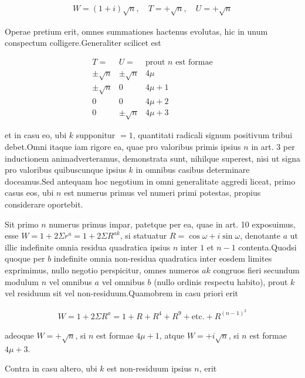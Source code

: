 \[
\begin{aligned}
W=(1+i)\surd n,\quad T=+\surd n,\quad U=+\surd n
\end{aligned}
\]


Operae pretium erit, omnes summationes hactenus evolutas, hic in unum conspectum colligere.\quad Generaliter scilicet est

\[
\begin{array}{c|c|c}
T=&U=&\text{prout }n\text{ est formae}\\\hline
\pm\surd n&\pm\surd n&4\mu\\
\pm\surd n&0&4\mu+1\\
0&0&4\mu+2\\
0&\pm\surd n&4\mu+3
\end{array}
\]

et in casu eo, ubi $k$ supponitur $=1$, quantitati radicali signum positivum tribui debet.\quad Omni itaque iam rigore ea, quae pro valoribus primis ipsius $n$ in art. 3 per inductionem animadverteramus, demonstrata sunt, nihilque superest, nisi ut signa pro valoribus quibuscunque ipsius $k$ in omnibus casibus determinare doceamus.\quad Sed antequam hoc negotium in omni generalitate aggredi liceat, primo casus eos, ubi $n$ est numerus primus vel numeri primi potestas, propius considerare oportebit.


Sit primo $n$ numerus primus impar, patetque per ea, quae in art. 10 exposuimus, esse $W=1+2\Sigma r^a=1+2\Sigma R^{ak}$, si statuatur $R=\cos\omega+i\sin\omega$, denotante $a$ ut illic indefinite omnia residua quadratica ipsius $n$ inter $1$ et $n-1$ contenta.\quad Quodsi quoque per $b$ indefinite omnia non-residua quadratica inter eosdem limites exprimimus, nullo negotio perspicitur, omnes numeros $ak$ congruos fieri secundum modulum $n$ vel omnibus $a$ vel omnibus $b$ (nullo ordinis respectu habito), prout $k$ vel residuum sit vel non-residuum.\quad Quamobrem in casu priori erit


\[
\begin{aligned}
W=1+2\Sigma R^a=1+R+R^4+R^9+\text{etc.}+R^{(n-1)^2}
\end{aligned}
\]

adeoque $W=+\surd n$, si $n$ est formae $4\mu+1$, atque $W=+i\surd n$, si $n$ est formae $4\mu+3$.

Contra in casu altero, ubi $k$ est non-residuum ipsius $n$, erit

